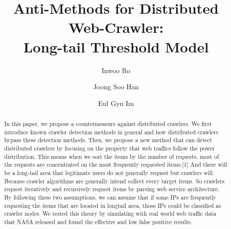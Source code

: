 \documentclass[sigconf,anonymous=true]{acmart}
\begin{document}
\title{Anti-Methods for Distributed Web-Crawler:\\ Long-tail Threshold Model}

\author{Inwoo Ro}

\author{Joong Soo Han}

\author{Eul Gyu Im}



\begin{abstract}
In this paper, we propose a countermeasure against distributed crawlers. We first introduce known crawler detection methods in general and how distributed crawlers bypass these detection methods. Then, we propose a new method that can detect distributed crawlers by focusing on the property that web traffics follow the power distribution. This means when we sort the items by the number of requests, most of the requests are concentrated on the most frequently requested items.[1] And there will be a long-tail area that legitimate users do not generally request but crawlers will. Because crawler algorithms are generally intend collect every target items. So crawlers request iteratively and recursively request items by parsing web service architecture. By following these two assumptions, we can assume that if some IPs are frequently requesting the items that are located in longtail area, those IPs could be classified as crawler nodes. We tested this theory by simulating with real world web traffic data that NASA released and found the effective and low false positive results.
\end{abstract}
\end{document}
